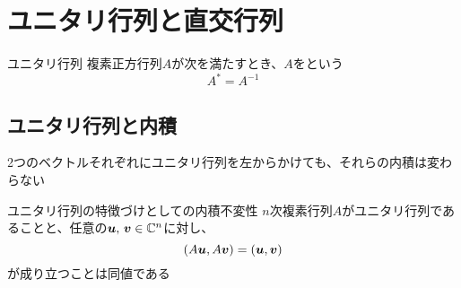 \documentclass[../../../topic_linear-algebra]{subfiles}
\begin{document}
\sectionline
\section{ユニタリ行列と直交行列}

\begin{definition}{ユニタリ行列}\label{def:unitary-matrix}
  複素正方行列$A$が次を満たすとき、$A$をという
  \begin{equation*}
    A^* = A^{-1}
  \end{equation*}
\end{definition}

\subsection{ユニタリ行列と内積}

2つのベクトルそれぞれにユニタリ行列を左からかけても、それらの内積は変わらない

\begin{theorem}{ユニタリ行列の特徴づけとしての内積不変性}\label{thm:unitary-characterized-by-inner-product-invariance}
  $n$次複素行列$A$がユニタリ行列であることと、任意の$\vb*{u},\,\vb*{v} \in \mathbb{C}^n$に対し、
  \begin{equation*}
    (A\vb*{u}, A\vb*{v}) = (\vb*{u}, \vb*{v})
  \end{equation*}
  が成り立つことは同値である
\end{theorem}
\end{document}

